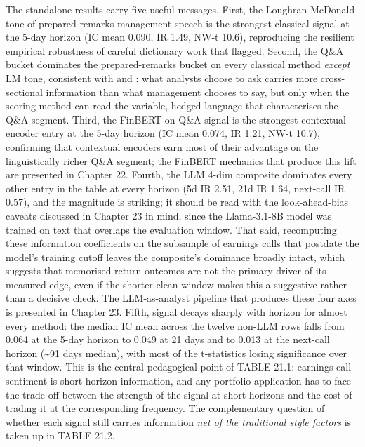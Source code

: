 \bigskip

The standalone results carry five useful messages. First, the Loughran-McDonald tone of prepared-remarks management speech is the strongest classical signal at the 5-day horizon (IC mean 0.090, IR 1.49, NW-t 10.6), reproducing the resilient empirical robustness of careful dictionary work that \cite{lis2024investor} flagged. Second, the Q\&A bucket dominates the prepared-remarks bucket on every classical method \textit{except} LM tone, consistent with \cite{zhao2018alpha} and \cite{chiang2025boardroom}: what analysts choose to ask carries more cross-sectional information than what management chooses to say, but only when the scoring method can read the variable, hedged language that characterises the Q\&A segment. Third, the FinBERT-on-Q\&A signal is the strongest contextual-encoder entry at the 5-day horizon (IC mean 0.074, IR 1.21, NW-t 10.7), confirming that contextual encoders earn most of their advantage on the linguistically richer Q\&A segment; the FinBERT mechanics that produce this lift are presented in Chapter 22. Fourth, the LLM 4-dim composite dominates every other entry in the table at every horizon (5d IR 2.51, 21d IR 1.64, next-call IR 0.57), and the magnitude is striking; it should be read with the look-ahead-bias caveats discussed in Chapter 23 in mind, since the Llama-3.1-8B model was trained on text that overlaps the evaluation window. That said, recomputing these information coefficients on the subsample of earnings calls that postdate the model's training cutoff leaves the composite's dominance broadly intact, which suggests that memorised return outcomes are not the primary driver of its measured edge, even if the shorter clean window makes this a suggestive rather than a decisive check. The LLM-as-analyst pipeline that produces these four axes is presented in Chapter 23. Fifth, signal decays sharply with horizon for almost every method: the median IC mean across the twelve non-LLM rows falls from 0.064 at the 5-day horizon to 0.049 at 21 days and to 0.013 at the next-call horizon ({\textasciitilde}91 days median), with most of the t-statistics losing significance over that window. This is the central pedagogical point of TABLE 21.1: earnings-call sentiment is short-horizon information, and any portfolio application has to face the trade-off between the strength of the signal at short horizons and the cost of trading it at the corresponding frequency. The complementary question of whether each signal still carries information \textit{net of the traditional style factors} is taken up in TABLE 21.2.

